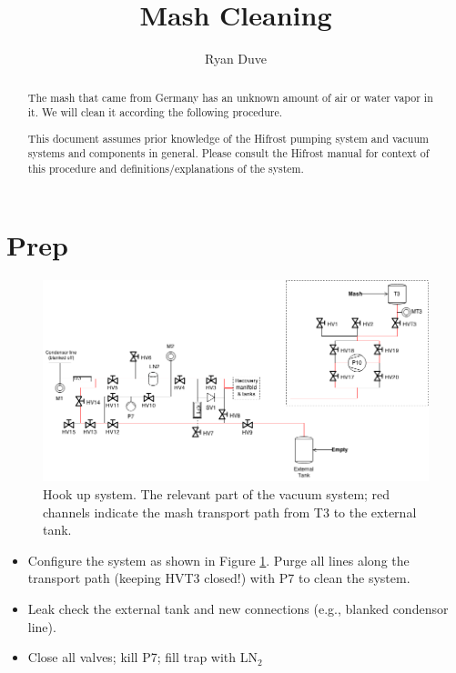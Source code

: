 \documentclass[a4paper,10pt]{article}
\title{Mash Cleaning}
\author{Ryan Duve}
\begin{document}
\maketitle

\begin{abstract}

\vspace{.5cm}


The mash that came from Germany has an unknown amount of air or water vapor in it.  We will clean it according the following procedure.

This document assumes prior knowledge of the Hifrost pumping system and vacuum systems and components in general.  Please consult the Hifrost manual for context of this procedure and definitions/explanations of the system.
\end{abstract}

\section{Prep}
\begin{figure}[htbp!]
 \centering
 \includegraphics[width=\textwidth]{./mash-cleaning-schematic-1.png}
 \caption{Hook up system.  The relevant part of the vacuum system; red channels indicate the mash transport path from T3 to the external tank.}
 \label{a}
\end{figure}

\begin{itemize}
 \item Configure the system as shown in Figure \ref{a}. Purge all lines along the transport path (keeping HVT3 closed!) with P7 to clean the system.
 \item Leak check the external tank and new connections (e.g., blanked condensor line).
 \item Close all valves; kill P7; fill trap with LN$_2$
\end{itemize}
\end{document}

